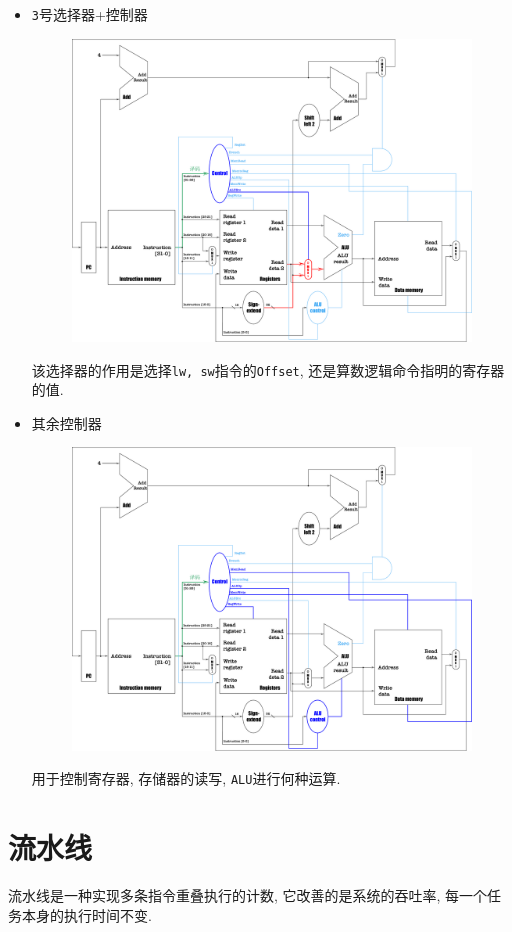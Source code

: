 \begin{itemize}
\item \verb|3|号选择器+控制器
\begin{figure}[H]
\centering
\includegraphics[scale=.2]{img/figure34.pdf}
\end{figure}
该选择器的作用是选择\verb|lw, sw|指令的\verb|Offset|, 还是算数逻辑命令指明的寄存器的值.
\item 其余控制器
\begin{figure}[H]
\centering
\includegraphics[scale=.2]{img/figure35.pdf}
\end{figure}
用于控制寄存器, 存储器的读写, \verb|ALU|进行何种运算.
\end{itemize}
\section{流水线}
流水线是一种实现多条指令重叠执行的计数, 它改善的是系统的吞吐率, 每一个任务本身的执行时间不变. \par
